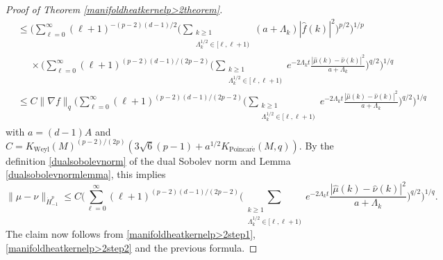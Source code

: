 \documentclass[11pt,a4paper]{article}
\theoremstyle{definition}
\begin{document}
\begin{proof}[Proof of Theorem \ref{manifoldheatkernelp>2theorem}]
\[ \begin{split} &\le \Bigg( \sum_{\ell=0}^{\infty} (\ell+1)^{-(p-2)(d-1)/2} \Bigg( \sum_{\substack{k \ge 1 \\ \Lambda_k^{1/2} \in [\ell, \ell+1)}} (a+\Lambda_k) |\widehat{f}(k)|^2 \Bigg)^{p/2} \Bigg)^{1/p} \\ &{\phantom{\le}} \times \Bigg( \sum_{\ell=0}^{\infty} (\ell+1)^{(p-2)(d-1)/(2p-2)} \Bigg( \sum_{\substack{k \ge 1 \\ \Lambda_k^{1/2} \in [\ell, \ell+1)}} e^{-2 \Lambda_k t} \frac{|\widehat{\mu}(k) - \widehat{\nu}(k)|^2}{a+\Lambda_k} \Bigg)^{q/2} \Bigg)^{1/q} \\ &\le C \| \nabla f \|_q \Bigg( \sum_{\ell=0}^{\infty} (\ell+1)^{(p-2)(d-1)/(2p-2)} \Bigg( \sum_{\substack{k \ge 1 \\ \Lambda_k^{1/2} \in [\ell, \ell+1)}} e^{-2 \Lambda_k t} \frac{|\widehat{\mu}(k) - \widehat{\nu}(k)|^2}{a+\Lambda_k} \Bigg)^{q/2} \Bigg)^{1/q} \end{split} \]
with $a=(d-1)A$ and $C= K_{\mathrm{Weyl}}(M)^{(p-2)/(2p)} (3 \sqrt{6} (p-1) + a^{1/2} K_{\mathrm{Poincar\acute{e}}}(M,q))$. By the definition \eqref{dualsobolevnorm} of the dual Sobolev norm and Lemma \ref{dualsobolevnormlemma}, this implies
\[ \| \mu- \nu \|_{\dot{H}_{-1}^p} \le C \Bigg( \sum_{\ell=0}^{\infty} (\ell+1)^{(p-2)(d-1)/(2p-2)} \Bigg( \sum_{\substack{k \ge 1 \\ \Lambda_k^{1/2} \in [\ell, \ell+1)}} e^{-2 \Lambda_k t} \frac{|\widehat{\mu}(k) - \widehat{\nu}(k)|^2}{a+\Lambda_k} \Bigg)^{q/2} \Bigg)^{1/q} . \]
The claim now follows from \eqref{manifoldheatkernelp>2step1}, \eqref{manifoldheatkernelp>2step2} and the previous formula.
\end{proof}
\end{document}
